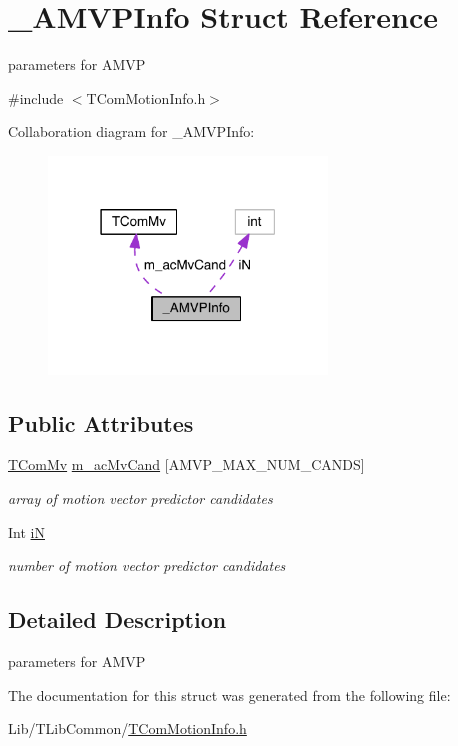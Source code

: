 \hypertarget{struct___a_m_v_p_info}{}\section{\+\_\+\+A\+M\+V\+P\+Info Struct Reference}
\label{struct___a_m_v_p_info}


parameters for A\+M\+VP  




{\ttfamily \#include $<$T\+Com\+Motion\+Info.\+h$>$}



Collaboration diagram for \+\_\+\+A\+M\+V\+P\+Info\+:
\nopagebreak
\begin{figure}[H]
\begin{center}
\leavevmode
\includegraphics[width=210pt]{d0/d4b/struct___a_m_v_p_info__coll__graph}
\end{center}
\end{figure}
\subsection*{Public Attributes}
\begin{DoxyCompactItemize}
\item 
\mbox{\label{struct___a_m_v_p_info_a1a06c043343f0edf7691cacafa886728}} 
\hyperlink{class_t_com_mv}{T\+Com\+Mv} \hyperlink{struct___a_m_v_p_info_a1a06c043343f0edf7691cacafa886728}{m\+\_\+ac\+Mv\+Cand} \mbox{[}A\+M\+V\+P\+\_\+\+M\+A\+X\+\_\+\+N\+U\+M\+\_\+\+C\+A\+N\+DS\mbox{]}
\begin{DoxyCompactList}\small\item\em array of motion vector predictor candidates \end{DoxyCompactList}\item 
\mbox{\label{struct___a_m_v_p_info_a921ce7317be0b56cbecba7e73d8f8672}} 
Int \hyperlink{struct___a_m_v_p_info_a921ce7317be0b56cbecba7e73d8f8672}{iN}
\begin{DoxyCompactList}\small\item\em number of motion vector predictor candidates \end{DoxyCompactList}\end{DoxyCompactItemize}


\subsection{Detailed Description}
parameters for A\+M\+VP 

The documentation for this struct was generated from the following file\+:\begin{DoxyCompactItemize}
\item 
Lib/\+T\+Lib\+Common/\hyperlink{_t_com_motion_info_8h}{T\+Com\+Motion\+Info.\+h}\end{DoxyCompactItemize}

